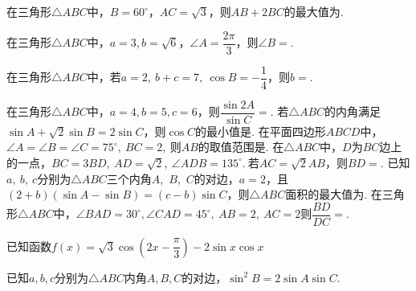 \begin{questions}
\qs 在三角形$\triangle ABC$中，$ B=60^{\circ} $，$ AC=\sqrt{3} $，则$ AB+2BC $的最大值为\tk.


\qs 在三角形$\triangle ABC$中，$ a=3,b=\sqrt{6} $，$ \angle A=\dfrac{2\pi}{3} $，则$ \angle B= $\tk.

\qs 在三角形$\triangle ABC$中，若$ a=2,\ b+c=7,\ \cos B=-\dfrac{1}{4} $，则$ b= $\tk.

\qs 在三角形$\triangle ABC$中，$ a=4,b=5,c=6 $，则$ \dfrac{\sin 2A}{\sin C}=$\tk.
\qs 若$\triangle ABC$的内角满足$ \sin A+\sqrt{2}\sin B=2\sin C $，则$ \cos C $的最小值是\tk.
\question 在平面四边形$ABCD$中，$\angle A=\angle B=\angle C=75^{\circ},\ $$ BC=2,\  $则$AB$的取值范围是\tk.
\qs 在$\triangle ABC$中，$ D $为$ BC $边上的一点，$ BC=3BD,\ AD=\sqrt{2},\ \angle ADB=135^{\circ}.\  $若$ AC=\sqrt{2}AB $，则$ BD= $\tk.
\question 已知$a,\ b,\ c$分别为$\triangle ABC$三个内角$A$,\ $B$,\ $C$的对边，$a=2$，且$(2+b)(\sin A-\sin B)=(c-b)\sin C$，则$\triangle ABC$面积的最大值为\tk.
\qs 在三角形$\triangle ABC$中，$ \angle BAD=30^{\circ},\angle CAD=45^{\circ},\ AB=2,\ AC=2 $则$ \dfrac{BD}{DC}= $\tk.
\vspace{-2em}
\begin{center}
\end{center} 


\qs 已知函数$f(x)=\sqrt{3}\cos\left(2x-\dfrac{\pi}{3}\right)-2\sin x\cos x$
\kb 
\qs 已知$a,b,c$分别为$\triangle ABC$内角$A,B,C$的对边，$\sin^2B=2\sin A\sin C$.
\end{questions}
